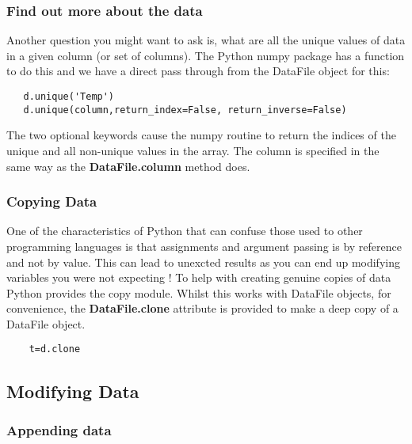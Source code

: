 \documentclass[a4paper,11pt]{scrartcl}
\begin{document}
\subsubsection{Find out more about the data}

Another question you might want to ask is, what are all the unique
values of data in a given column (or set of columns). The Python numpy
package has a function to do this and we have a direct pass through
from the DataFile object for this:

\begin{lstlisting}
   d.unique('Temp')
   d.unique(column,return_index=False, return_inverse=False)
\end{lstlisting}

The two optional keywords cause the numpy routine to return the
indices of the unique and all non-unique values in the array. The
column is specified in the same way as the \textbf{DataFile.column}
method does.

\subsubsection{Copying Data}

One of the characteristics of Python that can confuse those used to other
programming languages is that assignments and argument passing is by reference
and not by value. This can lead to unexcted results as you can end up modifying variables you were not expecting ! To help with creating genuine copies of data Python provides the copy module. Whilst this works with DataFile objects, for convenience, the \textbf{DataFile.clone} attribute is provided to make a deep copy of a DataFile object.


\begin{lstlisting}
    t=d.clone
\end{lstlisting}


\subsection{Modifying Data}

\subsubsection{Appending data}
\end{document}
